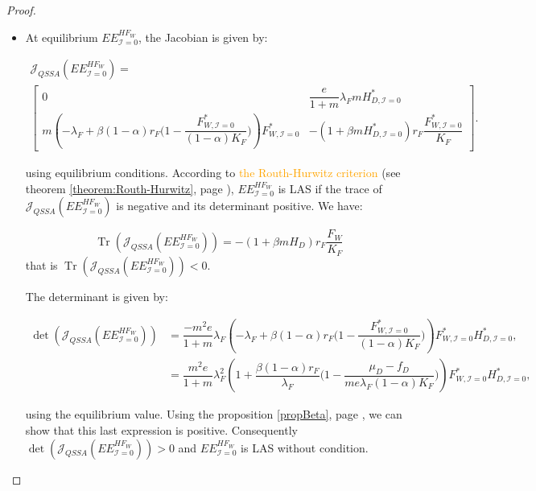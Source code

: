 \documentclass{article}
\newcommand{\lfw}{\lambda_{F}}
\newcommand{\lfw}{\lambda_{F}}
\newcommand{\cI}{\mathcal{I}}
\newcommand{\vdeux}[1]{\textcolor{orange}{#1}}
\DeclareMathOperator{\Tr}{Tr}
\theoremstyle{definition}
\theoremstyle{remark}
\begin{document}
\begin{proof}
\begin{itemize}
\item At equilibrium $EE^{HF_W}_{\cI = 0}$, the Jacobian is given by:

\begin{multline*}
\mathcal{J}_{QSSA}(EE^{HF_W}_{\cI = 0}) = \\
\begin{bmatrix}
0 & \dfrac{e}{1+m} \lfw m H^*_{D, \cI = 0} \\
m\left(-\lfw + \beta (1-\alpha) r_F \Big(1- \dfrac{F^*_{W, \cI = 0}}{(1-\alpha)K_F} \Big) \right) F^*_{W, \cI = 0} & -(1+\beta m H^*_{D, \cI = 0}) r_F \dfrac{F^*_{W, \cI = 0}}{K_F} 
\end{bmatrix}.
\end{multline*}

using equilibrium conditions. According to \vdeux{the Routh-Hurwitz criterion} (see theorem \ref{theorem:Routh-Hurwitz}, page \pageref{theorem:Routh-Hurwitz} ),  $EE^{HF_W}_{\cI = 0}$ is LAS if the trace of $\mathcal{J}_{QSSA}(EE^{HF_W}_{\cI = 0}) $ is negative and its determinant positive. We have:

\begin{equation*}
\Tr(\mathcal{J}_{QSSA}(EE^{HF_W}_{\cI = 0})) = -(1+\beta m H_D) r_F \dfrac{F_W}{K_F}
\end{equation*}
that is $\Tr(\mathcal{J}_{QSSA}(EE^{HF_W}_{\cI = 0})) < 0$.

The determinant is given by:

\begin{align*}
\det(\mathcal{J}_{QSSA}(EE^{HF_W}_{\cI = 0})) &=  \dfrac{- m^2 e}{1+m} \lfw \left(-\lfw + \beta (1-\alpha) r_F \Big(1- \dfrac{F^*_{W, \cI = 0}}{(1-\alpha)K_F} \Big) \right) F^*_{W, \cI = 0} H^*_{D, \cI = 0}, \\
&= \dfrac{m^2 e}{1+m} \lfw^2 \left(1 + \dfrac{\beta (1-\alpha) r_F}{\lfw} \Big(1- \dfrac{\mu_D - f_D}{me \lfw(1-\alpha)K_F} \Big) \right) F^*_{W, \cI = 0} H^*_{D, \cI = 0},
\end{align*}

using the equilibrium value. Using the proposition \ref{propBeta}, page \pageref{propBeta}, we can show that this last expression is positive. Consequently $\det(\mathcal{J}_{QSSA}(EE^{HF_W}_{\cI = 0})) > 0$ and $EE^{HF_W}_{\cI = 0}$ is LAS without condition.
\end{itemize}
\end{proof}
\end{document}
